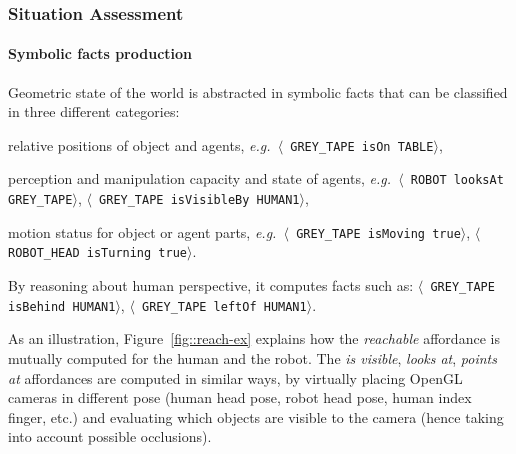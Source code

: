 \documentclass[preprint,3p,times]{elsarticle}
\newcommand{\stmt}[1]{{\footnotesize \tt $\langle$ #1\relax$\rangle$}}
\newcommand{\eg}{{\textit{e.g.\ }}}
\begin{document}
\begin{table}
\label{table|beliefsfig7}
\end{table}

\subsubsection{Situation Assessment}

\paragraph{Symbolic facts production} 

\begin{inparaenum}[\itshape 1\upshape)]
Geometric state of the world is abstracted in symbolic facts that can be
classified in three different categories: \item relative positions of object and
agents, \eg  \stmt{GREY\_TAPE isOn TABLE}, \item perception and manipulation
capacity and state of agents, \eg \stmt{ROBOT looksAt GREY\_TAPE},
\stmt{GREY\_TAPE isVisibleBy HUMAN1}, \item motion status for object or
agent parts, \eg \stmt{GREY\_TAPE isMoving true}, \stmt{ROBOT\_HEAD
isTurning true}.
\end{inparaenum}
By reasoning about human perspective, it computes facts such as:
\stmt{GREY\_TAPE isBehind HUMAN1}, \stmt{GREY\_TAPE leftOf HUMAN1}.

As an illustration, Figure~\ref{fig::reach-ex} explains how the \emph{reachable}
affordance is mutually computed for the human and the robot. The \emph{is visible},
\emph{looks at}, \emph{points at} affordances are computed in similar ways, by
virtually placing OpenGL cameras in different pose (human head pose, robot head
pose, human index finger, etc.) and evaluating which objects are visible to the camera
(hence taking into account possible occlusions).
\end{document}
